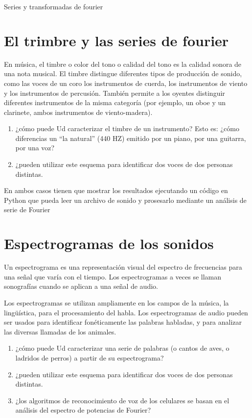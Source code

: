 \documentclass[spanish,notitlepage,letterpaper,11pt]{article} %
\begin{document}
\begin{center}
{\LARGE Series y transformadas de fourier}    
\end{center}
\section{El trimbre y las series de fourier}
En música, el timbre o color del tono o calidad del tono es la calidad sonora de una nota musical. El timbre distingue diferentes tipos de producción de sonido, como las voces de un coro los instrumentos de cuerda, los instrumentos de viento y los instrumentos de percusión. También permite a los oyentes distinguir diferentes instrumentos de la misma categoría (por ejemplo, un oboe y un clarinete, ambos instrumentos de viento-madera).

\begin{enumerate}
  \item ¿cómo puede Ud caracterizar el timbre de un instrumento? Esto es: ¿cómo diferencias un ``la natural'' (440 HZ) emitido por un piano, por una guitarra, por una voz?
  \item ¿pueden utilizar este esquema para identificar dos voces de dos personas distintas.
\end{enumerate}

En ambos casos tienen que mostrar los resultados ejecutando un código en Python que pueda leer un archivo de sonido y prosesarlo mediante un análisis de serie de Fourier

\section{Espectrogramas de los sonidos}
Un espectrograma es una representación visual del espectro de frecuencias para una señal que varía con el tiempo. Los espectrogramas a veces se llaman sonografías cuando se aplican a una señal de audio. 

Los espectrogramas se utilizan ampliamente en los campos de la música, la lingüística, para el procesamiento del habla. Los espectrogramas de audio pueden ser usados para identificar fonéticamente las palabras habladas, y para analizar las diversas llamadas de los animales.

\begin{enumerate}
  \item ¿cómo puede Ud caracterizar una serie de palabras (o cantos de aves, o ladridos de perros) a partir de su espectrograma?  
  \item ¿pueden utilizar este esquema para identificar dos voces de dos personas distintas.
  \item ¿los algoritmos de reconocimiento de voz de los celulares se basan en el análisis del espectro de potencias de Fourier?
\end{enumerate}

%
%
\end{document}
